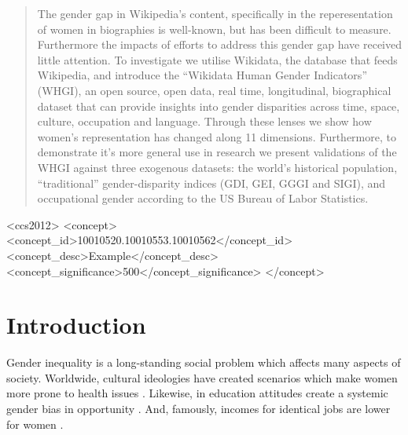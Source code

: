 \documentclass{sig-alternate-05-2015}
\begin{document}
\maketitle
\begin{abstract}
The gender gap in Wikipedia's content, specifically in the reperesentation of women in biographies is well-known, but has been difficult to measure. Furthermore the impacts of efforts to address this gender gap have received little attention. To investigate we utilise Wikidata, the database that feeds Wikipedia, and introduce the ``Wikidata Human Gender Indicators'' (WHGI), an open source, open data, real time, longitudinal, biographical dataset that can provide insights into gender disparities across time, space, culture, occupation and language. Through these lenses we show how women's representation has changed along 11 dimensions. Furthermore, to demonstrate it's more general use in research we present validations of the WHGI against three exogenous datasets: the world's historical population, ``traditional'' gender-disparity indices (GDI, GEI, GGGI and SIGI), and occupational gender according to the US Bureau of Labor Statistics.
\end{abstract}


%
%
\begin{CCSXML}
<ccs2012>
 <concept>
  <concept_id>10010520.10010553.10010562</concept_id>
  <concept_desc>Example</concept_desc>
  <concept_significance>500</concept_significance>
 </concept>

\end{CCSXML}



%
%

%
%
\printccsdesc



\section{Introduction}

Gender inequality is a long-standing social problem which affects many aspects of society. Worldwide, cultural ideologies have created scenarios which make women more prone to health issues \cite{world_health_organization_women_2009}. Likewise, in education attitudes create a systemic gender bias in opportunity \cite{heward_gender_1999}. And, famously, incomes for identical jobs are lower for women \cite{burstein_equal_????}.
\end{document}
